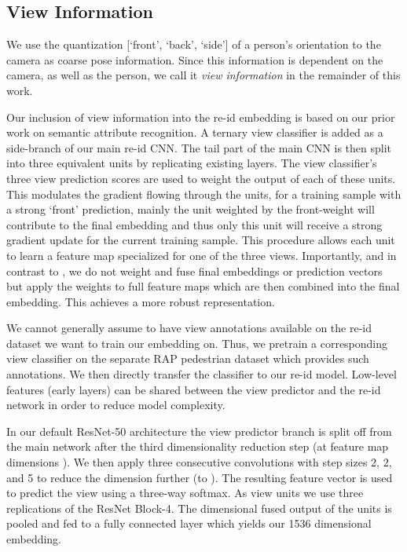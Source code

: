 \documentclass[10pt,twocolumn,letterpaper]{article}
\begin{document}
\subsection{View Information}
\label{sec:view}

We use the quantization [`front', `back', `side'] of a person's orientation to the camera
as coarse pose information. Since this information is dependent on the camera, as well as the person,
we call it \emph{view information} in the remainder of this work.

Our inclusion of view information into
the re-id embedding is based on our prior work \cite{BMVC} on semantic attribute recognition.
A ternary view classifier is added as a side-branch of our main re-id CNN. The tail part of the main CNN is then split into three equivalent units by 
replicating existing layers. The view classifier's three view prediction scores are used to weight
the output of each of these units. This modulates the gradient flowing through the units, \eg for a 
training sample with a strong `front' prediction, mainly the unit weighted by the front-weight will 
contribute to the final embedding and thus only this unit will receive a strong
gradient update for the current training sample. This procedure allows each unit to learn a feature map
specialized for one of the three views. Importantly, and in contrast to \cite{BMVC}, we do not weight 
and fuse final embeddings or prediction vectors but apply the weights to full feature maps which are then combined into the final embedding. This achieves a more robust representation.

We cannot generally assume to have view annotations available on the re-id 
dataset we want to train our embedding on. Thus, we pretrain a corresponding view classifier on the separate RAP \cite{RAP} pedestrian dataset which provides such annotations. We then directly transfer the classifier to our re-id model. Low-level features (\ie early layers) can be shared between the view predictor and the re-id network in order to reduce model complexity.

In our default ResNet-50 architecture the view predictor branch is split off from the main network after the third dimensionality reduction step (\ie at feature map dimensions ). We then apply three consecutive convolutions with step sizes 2, 2, and 5 to reduce the dimension further (to ). The resulting feature vector is used to predict the view using a three-way softmax. As view units we use three replications of the ResNet Block-4. The  dimensional fused output of the units is pooled and fed to a fully connected layer which yields our 1536 dimensional embedding.
\end{document}
